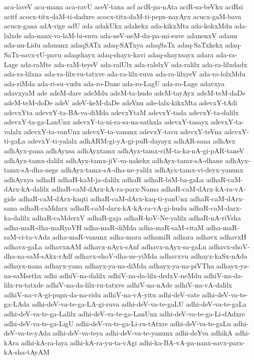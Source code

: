 {aca-laveV
aca-mana
aca-ravU
aceV-tana
acf
aciR-pa-nAta
aciR-sa-beVku
aciRsi
acitf
acocx-titx-daM-ti-dadxre
acocx-titx-daM-ti-pepx-nayAyx
acucx-gaM-bava
acucx-gana
adA-rige
adU
ada
adakUkx
adakekx
ada-kikxMta
ada-kokxMdu
ada-lalxde
ada-nanx-va-laM-bi-suva
ada-neV-neM-du-pa-mi-suve
adanenxV
adanu
ada-nu-Lidu
adanunx
adaqSATx
adaq-SATxya
adaqSaTx
adaq-SaTxkekx
adaq-SaTx-savx-rU-pavu
adaqshayx
adaq-shayx-kavi
adaq-shayxsayx
adara
ada-ra-Lage
ada-raMte
ada-raM-teyeV
ada-ralUlx
ada-ralelxV
ada-ralilx
ada-ra-lilxdadx
ada-ra-lilxna
ada-ra-lilx-ru-tatxve
ada-ra-lilx-ruva
ada-ra-lilxyeV
ada-ra-lolxMdu
ada-riMda
ada-ri-su-vudu
ada-ro-Dane
ada-ro-LagU
ada-ro-Lage
adavxya
adavxyaM
ade
adeM-dare
adeMdu
adeM-ta-hudo
adeM-tayAyx
adeM-teM-daDe
adeM-teM-doDe
adeV
adeV-keM-daDe
adeVnu
ade-lalx-kikxMta
adevxY-tAdi
adevxYta
adevxY-ta-BA-va-diMda
adevxYtaM
adevxY-tada
adevxY-ta-dalilx
adevxY-ta-ga-LanUnx
adevxY-ta-ni-ra-sa-na-sathxla
adevxY-tasayx
adevxY-ta-valalx
adevxY-ta-vanUnx
adevxY-ta-vanunx
adevxY-tavu
adevxY-teVna
adevxY-ti-gaLa
adevxY-ti-yalalx
adhARM-gi-yA-gi-puR-dayayx
adhAR-sana
adhAvx
adhAyx-pana
adhAyxsa
adhAyxtamx
adhAyx-tamx-ciM-ta-ka-nA-gi-pAR-taneV
adhAyx-tamx-dalilx
adhAyx-tamx-jiV-va-nakekx
adhAyx-tamx-sA-dhane
adhAyx-tamx-sA-dha-nege
adhAyx-tamx-sA-dha-ne-yalilx
adhAyx-tamx-vi-deyx-yanunx
adhAyxya
adhaH
adhaH-kaM-ja-dalilx
adhaR
adhaR-biM-ba-gaLa
adhaR-caM-dArx-kA-dalilx
adhaR-caM-dArx-kA-ra-parx-Nama
adhaR-caM-dArx-kA-ra-vA-gide
adhaR-caM-dArx-kaqti
adhaR-caM-dArx-kaq-ti-yanUnx
adhaR-caM-dArx-sana
adhaR-caMdarx
adhaR-caM-darx-kA-kA-ra-vA-gi-hudu
adhaR-caM-darx-ka-dalilx
adhaR-caMderxV
adhaR-gaja
adhaR-koV-Ne-yalilx
adhaR-nA-riVsha
adha-maR-dha-maRyoVH
adha-maR-diMda
adha-maR-saM-citaM
adha-maR-saM-ci-ta-vAda
adha-maR-vanunx
adha-mara
adhamiR
adhara
adhavx
adhavxH
adhavx-gaLa
adhavxnAM
adhavx-nAyx-sAnf
adhavx-nAyx-sa-gaLu
adhavx-shoV-dha-na-saM-sAkx-rAdf
adhavx-shoV-dha-ne-yiMda
adhavxvu
adhayx-kaSx-nAda
adhayx-nana
adhayx-yana
adhayx-ya-na-diMda
adhayx-ya-na-piVTha
adhayx-ya-na-saMsethx
adhi
adhiV-na-dalilx
adhiV-na-da-lilx-dedxV-neMdu
adhiV-na-da-lilx-ru-tatxde
adhiV-na-da-lilx-ru-tatxve
adhiV-na-nAde
adhiV-na-vA-dalilx
adhiV-na-vA-gi-pupx-da-na-ridu
adhiV-na-vA-yitu
adhi-deV-vate
adhi-deV-va-te-ga-LAda
adhi-deV-va-te-ga-LA-gi-ruva
adhi-deV-va-te-gaLU
adhi-deV-va-te-gaLa
adhi-deV-va-te-ga-Lalilx
adhi-deV-va-te-ga-LanUnx
adhi-deV-va-te-ga-Li-dAdxre
adhi-deV-va-te-ga-LigU
adhi-deV-va-te-ga-Li-ru-tAtxre
adhi-deV-va-te-gaLu
adhi-deV-va-te-yAda
adhi-deV-va-teya
adhi-deV-va-te-yanunx
adhi-deYva
adhikA
adhi-kAra
adhi-kA-ra-laya
adhi-kA-ra-yu-ta-vAgi
adhi-ka-BA-vA-pa-nanx-savx-parx-kA-sha-tAyAM
}
